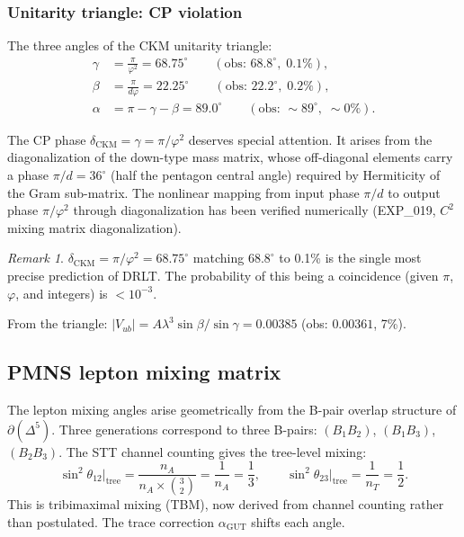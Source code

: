 \documentclass[12pt]{article}
\theoremstyle{remark}
\newtheorem{remark}[theorem]{Remark}
\theoremstyle{definition}
\newcommand{\agut}{\alpha_{\mathrm{GUT}}}
\begin{document}
\subsubsection{Unitarity triangle: CP violation}

The three angles of the CKM unitarity triangle:
\begin{align}
\gamma &= \frac{\pi}{\varphi^2} = 68.75^\circ \qquad (\text{obs: } 68.8^\circ,\; 0.1\%), \label{eq:gamma} \\
\beta &= \frac{\pi}{d\varphi} = 22.25^\circ \qquad (\text{obs: } 22.2^\circ,\; 0.2\%), \\
\alpha &= \pi - \gamma - \beta = 89.0^\circ \qquad (\text{obs: } \sim 89^\circ,\; \sim 0\%).
\end{align}

The CP phase $\delta_\text{CKM} = \gamma = \pi/\varphi^2$ deserves special attention. It arises from the diagonalization of the down-type mass matrix, whose off-diagonal elements carry a phase $\pi/d = 36^\circ$ (half the pentagon central angle) required by Hermiticity of the Gram sub-matrix. The nonlinear mapping from input phase $\pi/d$ to output phase $\pi/\varphi^2$ through diagonalization has been verified numerically (EXP\_019, $C^2$ mixing matrix diagonalization).

\begin{remark}
$\delta_\text{CKM} = \pi/\varphi^2 = 68.75^\circ$ matching $68.8^\circ$ to 0.1\% is the single most precise prediction of DRLT. The probability of this being a coincidence (given $\pi$, $\varphi$, and integers) is $< 10^{-3}$.
\end{remark}

From the triangle: $|V_{ub}| = A\lambda^3\sin\beta/\sin\gamma = 0.00385$ (obs: $0.00361$, 7\%).

\subsection{PMNS lepton mixing matrix}

The lepton mixing angles arise geometrically from the B-pair overlap structure of $\partial(\Delta^5)$.  Three generations correspond to three B-pairs: $(B_1 B_2)$, $(B_1 B_3)$, $(B_2 B_3)$.  The STT channel counting gives the tree-level mixing:
\begin{equation}
\sin^2\theta_{12}\big|_\text{tree} = \frac{n_A}{n_A \times \binom{3}{2}} = \frac{1}{n_A} = \frac{1}{3}, \qquad
\sin^2\theta_{23}\big|_\text{tree} = \frac{1}{n_T} = \frac{1}{2}.
\end{equation}
This is tribimaximal mixing (TBM), now derived from channel counting rather than postulated.  The trace correction $\agut$ shifts each angle.
\end{document}
